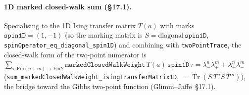 \documentclass[a4paper,11pt]{article}
\begin{document}
\paragraph{1D marked closed-walk sum (\S17.1).}
Specialising to the 1D Ising transfer matrix $T(a)$ with marks
$\texttt{spin1D} = (1,-1)$ (so the marking matrix is $S = \mathrm{diagonal}\,\texttt{spin1D}$,
\texttt{spinOperator\_eq\_diagonal\_spin1D}) and combining with \texttt{twoPointTrace},
the closed-walk form of the two-point numerator is
$\sum_{\tau : \mathrm{Fin}(n{+}m)\to\mathrm{Fin}\,2} \texttt{markedClosedWalkWeight}\,T(a)\,\texttt{spin1D}\,\tau = \lambda_-^n\lambda_+^m + \lambda_+^n\lambda_-^m$
(\texttt{sum\_markedClosedWalkWeight\_isingTransferMatrix1D}, $= \operatorname{Tr}(S\,T^n S\,T^m)$),
the bridge toward the Gibbs two-point function (Glimm--Jaffe~\S17.1).
\end{document}
